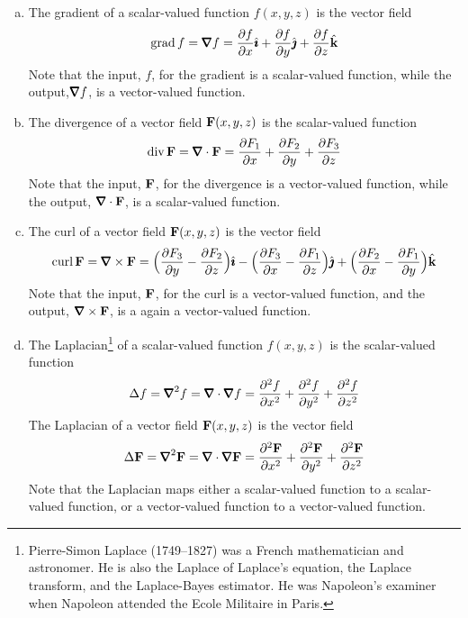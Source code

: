 \begin{defn}\label{def:gradDivCurl}
\begin{enumerate}[(a)]
\item
The gradient of a scalar-valued function $f(x,y,z)$ is the vector field
\begin{equation*}
\text{grad}\,f=\vnabla f 
   = \frac{\partial f}{\partial x}\hi
          +\frac{\partial f}{\partial y}\hj
          +\frac{\partial f}{\partial z} \hk
\end{equation*}
Note that the input, $f$, for the gradient is a scalar-valued function, 
while the output,$\vnabla f$, is a vector-valued function.
\item
The divergence of a vector field $\mathbf{F}(x,y,z)$ is the scalar-valued function
\begin{equation*}
\text{div}\,\vF=\vnabla\cdot\vF 
          = \frac{\partial F_1}{\partial x}
          +\frac{\partial F_2}{\partial y}
          +\frac{\partial F_3}{\partial z}
\end{equation*}
Note that the input, $\mathbf{F}$, for the divergence is a vector-valued function, 
while the output, $\vnabla\cdot\vF$, is a scalar-valued function.
\item
The curl of a vector field $\mathbf{F}(x,y,z)$ is the vector field
\begin{equation*}
\text{curl}\,\vF= \vnabla\times\vF 
= \Big(\frac{\partial F_3}{\partial y} -\frac{\partial F_2}{\partial z}\Big)\hi
-\Big(\frac{\partial F_3}{\partial x} -\frac{\partial F_1}{\partial z}\Big)\hj
+\Big(\frac{\partial F_2}{\partial x} -\frac{\partial F_1}{\partial y}\Big)\hk
\end{equation*}
Note that the input, $\mathbf{F}$, for the curl is a vector-valued function, 
and the output, $\vnabla\times\vF$, is a again a vector-valued function.
\item
The Laplacian\footnote{Pierre-Simon Laplace (1749--1827) 
was a French mathematician and astronomer. He is also the Laplace of 
Laplace's equation, the Laplace transform, and the Laplace-Bayes estimator.
He was Napoleon's examiner when Napoleon attended the Ecole Militaire 
in Paris.} 
of a scalar-valued function $f(x,y,z)$ is the scalar-valued function
\begin{equation*}
\Delta f= \vnabla^2 f =\vnabla\cdot\vnabla f
= \frac{\partial^2 f}{\partial x^2} 
+\frac{\partial^2 f}{\partial y^2}
+\frac{\partial^2 f}{\partial z^2}
\end{equation*}
The Laplacian of a vector field $\mathbf{F}(x,y,z)$ is the vector field
\begin{equation*}
\Delta\vF= \vnabla^2\vF =\vnabla\cdot\vnabla \vF
= \frac{\partial^2 \vF}{\partial x^2} 
+\frac{\partial^2 \vF}{\partial y^2}
+\frac{\partial^2 \vF}{\partial z^2}
\end{equation*}
Note that the Laplacian maps either a scalar-valued function to a 
scalar-valued function, or a vector-valued function to a vector-valued 
function.

\end{enumerate}
\end{defn}

